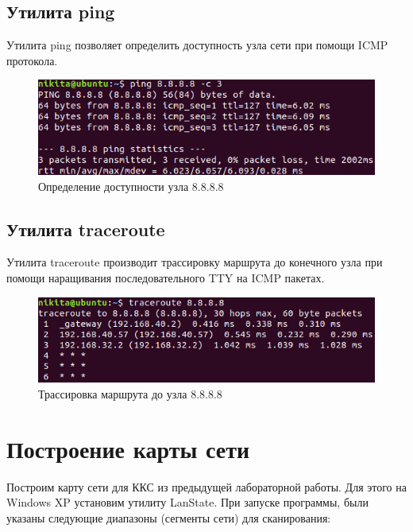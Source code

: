 \documentclass[14pt,a4paper,report]{report}
\begin{document}
\subsection{Утилита ping}

Утилита ping позволяет определить доступность узла сети при помощи ICMP протокола.

\begin{figure}[h!]
	\centering
	\includegraphics[scale = 0.95]{images/0_5.png}
	\caption{Определение доступности узла 8.8.8.8}
	\label{image:4}
\end{figure}

\clearpage

\subsection{Утилита traceroute}

Утилита traceroute производит трассировку маршрута до конечного узла при помощи наращивания последовательного TTY на ICMP пакетах.

\begin{figure}[h!]
	\centering
	\includegraphics[scale = 0.85]{images/0_6.png}
	\caption{Трассировка маршрута до узла 8.8.8.8}
	\label{image:5}
\end{figure}

\section{Построение карты сети}

Построим карту сети для ККС из предыдущей лабораторной работы. Для этого на Windows XP установим утилиту LanState. При запуске программы, были указаны следующие диапазоны (сегменты сети) для сканирования:
\end{document}
